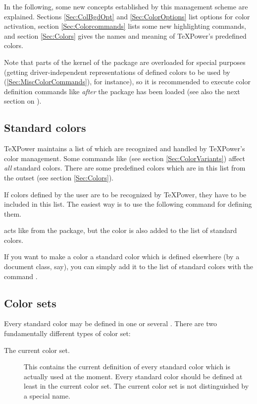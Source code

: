 \begin{slide}
  In the following, some new concepts established by this management scheme are explained. Sections \ref{Sec:ColBgdOpt}
  and \ref{Sec:ColorOptions} list options for color activation, section \ref{Sec:Colorcommands} lists some new
  highlighting commands, and section \ref{Sec:Colors} gives the names and meaning of \TeX Power's predefined colors.

  Note that parts of the kernel of the
  \href{ftp://ftp.dante.de/tex-archive/help/Catalogue/entries/color.html}{} package are overloaded for
  special purposes (getting driver-independent representations of defined colors to be used by 
  (\ref{Sec:MiscColorCommands}), for instance), so it is recommended to execute color definition commands like
   \emph{after} the  package has been loaded (see also the next section on
  ).

  \newslide

  \subsection{Standard colors}\label{Sec:StdCols}
  \TeX Power maintains a list of  which are recognized and handled by \TeX Power's color
  management. Some commands like  (see section \ref{Sec:ColorVariants}) affect \emph{all} standard
  colors. There are some predefined colors which are in this list from the outset (see section \ref{Sec:Colors}).

  If colors defined by the user are to be recognized by \TeX Power, they have to be included in this list. The easiest
  way is to use the following command for defining them.

  \newslide

   acts like 
   from the  package, but the color
   is also added to the list of standard colors.

  If you want to make a color a standard color which is defined elsewhere (by a document class, say), you can simply add
  it to the list of standard colors with the command
  .

  \newslide

  \subsection{Color sets}
  Every standard color may be defined in one or several . There are two fundamentally different
  types of color set:
  \begin{description}
  \item[The current color set.] This contains the current definition of every standard color which is actually used at
    the moment. Every standard color should be defined at least in the current color set. The current color set is not
    distinguished by a special name.


\end{description}
\end{slide}
